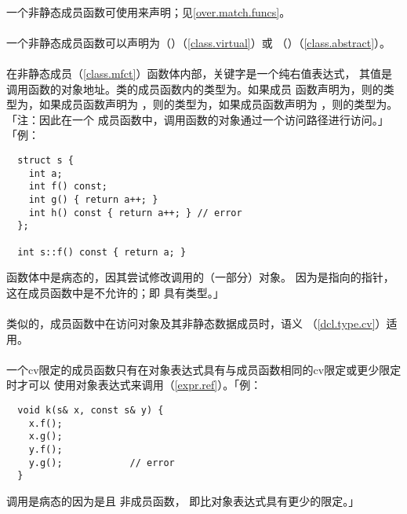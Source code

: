 \paragraph{}
一个非静态成员函数可使用来声明；见\ref{over.match.funcs}。

\paragraph{}
一个非静态成员函数可以声明为（）（\ref{class.virtual}）或
（）（\ref{class.abstract}）。

\paragraph{}
在非静态成员（\ref{class.mfct}）函数体内部，关键字是一个纯右值表达式，
其值是调用函数的对象地址。类的成员函数内的类型为。如果成员
函数声明为，则的类型为，如果成员函数声明为
，则的类型为，如果成员函数声明为
，则的类型为。「注：因此在一个
成员函数中，调用函数的对象通过一个访问路径进行访问。」「例：
\begin{lstlisting}
  struct s {
    int a;
    int f() const;
    int g() { return a++; }
    int h() const { return a++; } // error
  };

  int s::f() const { return a; }
\end{lstlisting}
函数体中是病态的，因其尝试修改调用的（一部分）对象。
因为是指向的指针，这在成员函数中是不允许的；即
具有类型。」

\paragraph{}
类似的，成员函数中在访问对象及其非静态数据成员时，语义
（\ref{dcl.type.cv}）适用。

\paragraph{}
一个cv限定的成员函数只有在对象表达式具有与成员函数相同的cv限定或更少限定时才可以
使用对象表达式来调用（\ref{expr.ref}）。「例：
\begin{lstlisting}
  void k(s& x, const s& y) {
    x.f();
    x.g();
    y.f();
    y.g();            // error
  }
\end{lstlisting}
调用是病态的因为是且 非成员函数，
即比对象表达式具有更少的限定。」

